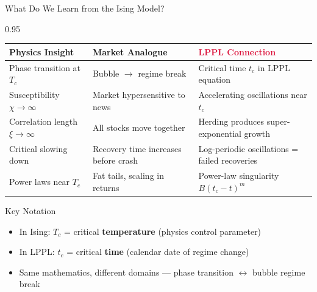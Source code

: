 \documentclass[9pt, aspectratio=169, t]{beamer}
\begin{document}
\begin{frame}{What Do We Learn from the Ising Model?}
    \begin{cminipage}{0.95\textwidth}
    {\scriptsize
    \begin{center}
    \renewcommand{\arraystretch}{1.4}
    \begin{tabular}{>{\raggedright\arraybackslash}p{3.2cm} >{\raggedright\arraybackslash}p{4.0cm} >{\raggedright\arraybackslash}p{4.0cm}}
        \toprule
        \textbf{\textcolor{MainBlue}{Physics Insight}} & \textbf{\textcolor{Forest}{Market Analogue}} & \textbf{\textcolor{Crimson}{LPPL Connection}} \\
        \midrule
        Phase transition at $T_c$ & Bubble $\to$ regime break & Critical time $t_c$ in LPPL equation \\
        Susceptibility $\chi \to \infty$ & Market hypersensitive to news & Accelerating oscillations near $t_c$ \\
        Correlation length $\xi \to \infty$ & All stocks move together & Herding produces super-exponential growth \\
        Critical slowing down & Recovery time increases before crash & Log-periodic oscillations = failed recoveries \\
        Power laws near $T_c$ & Fat tails, scaling in returns & Power-law singularity $B(t_c - t)^m$ \\
        \bottomrule
    \end{tabular}
    \end{center}
    }
    \vspace{2mm}
    {\footnotesize
    \begin{alertblock}{Key Notation}
        \begin{itemize}\setlength{\itemsep}{0pt}
            \item In Ising: $T_c$ = critical \textbf{temperature} (physics control parameter)
            \item In LPPL: $t_c$ = critical \textbf{time} (calendar date of regime change)
            \item Same mathematics, different domains --- phase transition $\leftrightarrow$ bubble regime break
        \end{itemize}
    \end{alertblock}
    }
    \end{cminipage}
\end{frame}

\end{document}

